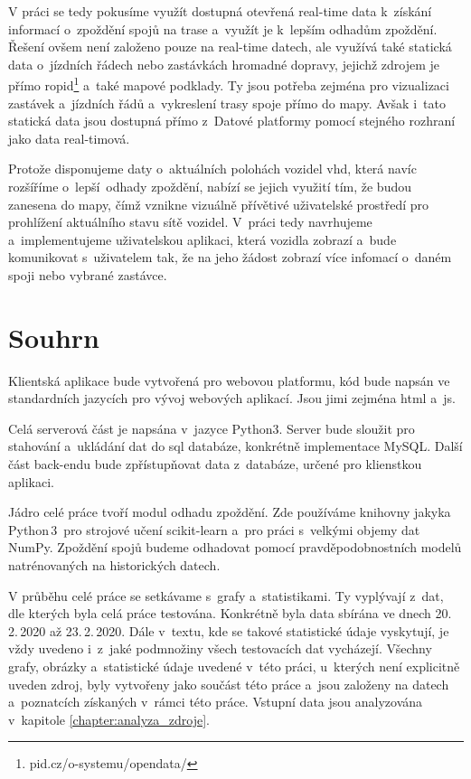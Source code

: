 \bigbreak

V práci se tedy pokusíme využít dostupná otevřená real-time data k~získání informací o~zpoždění spojů na trase a~využít je k~lepším odhadům zpoždění. Řešení ovšem není založeno pouze na real-time datech, ale využívá také statická data o~jízdních řádech nebo zastávkách hromadné dopravy, jejichž zdrojem je přímo \gls{ropid}\footnote{pid.cz/o-systemu/opendata/} a~také mapové podklady. Ty jsou potřeba zejména pro vizualizaci zastávek a~jízdních řádů a~vykreslení trasy spoje přímo do mapy. Avšak i~tato statická data jsou dostupná přímo z~Datové platformy pomocí stejného rozhraní jako data real-timová.

\bigbreak

Protože disponujeme daty o~aktuálních polohách vozidel \gls{vhd}, která navíc rozšíříme o~lepší odhady zpoždění, nabízí se jejich využití tím, že budou zanesena do mapy, čímž vznikne vizuálně přívětivé uživatelské prostředí pro prohlížení aktuálního stavu sítě vozidel. V~práci tedy navrhujeme a~implementujeme uživatelskou aplikaci, která vozidla zobrazí a~bude komunikovat s~uživatelem tak, že na jeho žádost zobrazí více infomací o~daném spoji nebo vybrané zastávce.

\section*{Souhrn}

Klientská aplikace bude vytvořená pro webovou platformu, kód bude napsán ve standardních jazycích pro vývoj webových aplikací. Jsou jimi zejména \gls{html} a~\gls{js}.

\bigbreak

Celá serverová část je napsána v~jazyce Python3. Server bude sloužit pro stahování a~ukládání dat do \gls{sql} databáze, konkrétně implementace MySQL. Další část back-endu bude zpřístupňovat data z~databáze, určené pro klienstkou aplikaci.

\bigbreak

Jádro celé práce tvoří modul odhadu zpoždění. Zde používáme knihovny jakyka Python\,3~pro strojové učení scikit-learn a~pro práci s~velkými objemy dat NumPy. Zpoždění spojů budeme odhadovat pomocí pravděpodobnostních modelů natrénovaných na historických datech.

\bigbreak

V průběhu celé práce se setkávame s~grafy a~statistikami. Ty vyplývají z~dat, dle kterých byla celá práce testována. Konkrétně byla data sbírána ve dnech 20.\,2.\,2020 až 23.\,2.\,2020. Dále v~textu, kde se takové statistické údaje vyskytují, je vždy uvedeno i~z~jaké podmnožiny všech testovacích dat vycházejí. Všechny grafy, obrázky a~statistické údaje uvedené v~této práci, u~kterých není explicitně uveden zdroj, byly vytvořeny jako součást této práce a~jsou založeny na datech a~poznatcích získaných v~rámci této práce. Vstupní data jsou analyzována v~kapitole \ref{chapter:analyza_zdroje}.

